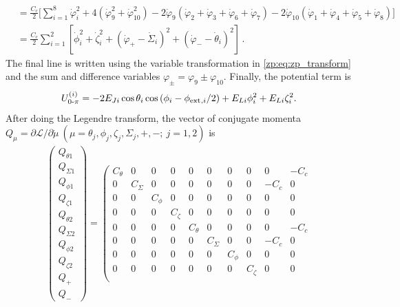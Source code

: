 \begin{widetext}
\begin{align}
&= \frac{C_{c}}{2} \Big [ \sum_{i=1}^{8}{\dot{\varphi}_i^2}
+ 4(\dot{\varphi}_9^2 + \dot{\varphi}_{10}^2)
-2\dot{\varphi}_9 (\dot{\varphi}_2 + \dot{\varphi}_3 + \dot{\varphi}_6 + \dot{\varphi}_7)
-2\dot{\varphi}_{10} (\dot{\varphi}_1 + \dot{\varphi}_4 + \dot{\varphi}_5 + \dot{\varphi}_8) \Big ]   \nonumber
 \\
&=\frac{C_c}{2}\sum_{i=1}^{2} [\dot{\phi}_i^2 + \dot{\zeta}_i^2
+(\dot{\varphi }_+ - \dot{\Sigma }_i)^2
+(\dot{\varphi }_- - \dot{\theta }_i)^2 ] \, .
\end{align}
The final line is written using the variable transformation in \cref{zp:eq:zp_transform} and the sum and difference variables
$\varphi_{\pm}=\varphi_9\pm\varphi_{10}$.
Finally, the potential term is
\begin{equation}
U_{0\text{-}\pi}^{(i)}
=-2E_{Ji} \cos{\theta_i} \cos{(\phi_i-\phi_{\rm ext}{}_{,i}/2)} + E_{Li}\phi_i^2 + E_{Li} \zeta_i^2 .
\end{equation}
After doing the Legendre transform, the vector of conjugate momenta $Q_\mu=\partial\mathcal{L}/\partial\dot{\mu}\ (\mu=\theta_j,\phi_j,\zeta_j,\Sigma_j,+,-;\ j=1,2)$ is
\begin{align} \label{zp:eq:capacitance_mat1}
\left(\begin{array}{c}
Q_{\theta 1} \\
Q_{\Sigma 1} \\
Q_{\phi 1} \\
Q_{\zeta 1} \\
Q_{\theta 2} \\
Q_{\Sigma 2} \\
Q_{\phi 2} \\
Q_{\zeta 2} \\
Q_{+}\\
Q_{-}
\end{array}\right)=\left(\begin{array}{cccccccccc}
C_\theta & 0 & 0  & 0 & 0  & 0 & 0  & 0 & 0  & -C_c \\
0 & C_\Sigma & 0  & 0 & 0  & 0 & 0  & 0 & -C_c  & 0 \\
0 & 0 & C_\phi  & 0 & 0  & 0 & 0  & 0 & 0  & 0 \\
0 & 0 & 0  & C_\zeta & 0  & 0 & 0  & 0 & 0  & 0 \\
0 & 0 & 0  & 0 & C_\theta  & 0 & 0  & 0 & 0  & -C_c \\
0 & 0 & 0  & 0 & 0  & C_\Sigma & 0  & 0 & -C_c  & 0 \\
0 & 0 & 0  & 0 & 0  & 0 & C_\phi  & 0 & 0  & 0 \\
0 & 0 & 0  & 0 & 0  & 0 & 0  & C_\zeta & 0  & 0 \\

\end{array}
\end{align}
\end{widetext}
